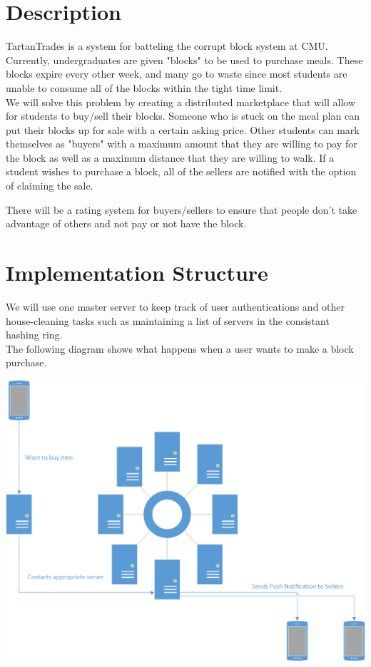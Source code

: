 \documentclass[12pt]{article}
\begin{document}
\maketitle

\section{Description}

TartanTrades is a system for batteling the corrupt block system at CMU\@.  Currently, undergraduates are given "blocks" to be used to purchase meals.
These blocks expire every other week, and many go to waste since most students are unable to consume all of the blocks within the tight time limit.\\

We will solve this problem by creating a distributed marketplace that will allow for students to buy/sell their blocks.  Someone who is stuck on the meal
plan can put their blocks up for sale with a certain asking price.  Other students can mark themselves as "buyers" with a maximum amount that they are willing
to pay for the block as well as a maximum distance that they are willing to walk.  If a student wishes to purchase a block, all of the sellers are notified with
the option of claiming the sale.

There will be a rating system for buyers/sellers to ensure that people don't take advantage of others and not pay or not have the block.


\section{Implementation Structure}

We will use one master server to keep track of user authentications and other house-cleaning tasks such as maintaining a list of servers in the consistant hashing ring.\\

The following diagram shows what happens when a user wants to make a block purchase.

\includegraphics[scale=.6]{./diagram-1.png}\\
\end{document}
